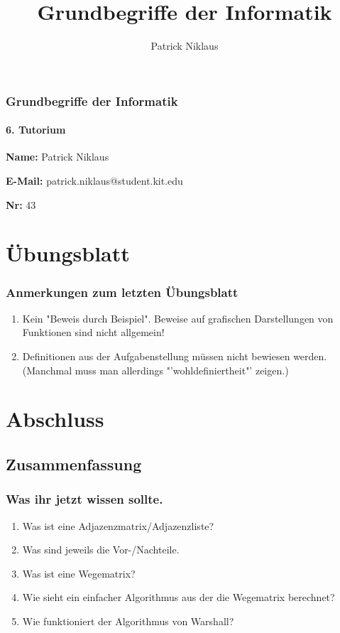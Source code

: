 \documentclass{beamer}
\title{Grundbegriffe der Informatik}
\author{Patrick Niklaus}
\begin{document}
\begin{frame}
  \frametitle{Grundbegriffe der Informatik}
  \framesubtitle{6. Tutorium}
  \begin{description}
    \item \textbf{Name:} Patrick Niklaus
    \item \textbf{E-Mail:} patrick.niklaus@student.kit.edu
    \item \textbf{Nr:} 43
  \end{description}
\end{frame}

\section{Übungsblatt}
\begin{frame}
  \frametitle{Anmerkungen zum letzten Übungsblatt}
  \begin{enumerate}
    \item Kein "Beweis durch Beispiel". Beweise auf grafischen Darstellungen von Funktionen sind nicht allgemein!
    \item Definitionen aus der Aufgabenstellung müssen nicht bewiesen werden.\\
          (Manchmal muss man allerdings "'wohldefiniertheit"' zeigen.)
  \end{enumerate}
\end{frame}




\section{Abschluss}
\subsection{Zusammenfassung}
\begin{frame}
  \frametitle{Was ihr jetzt wissen sollte.}
  \begin{enumerate}
    \item Was ist eine Adjazenzmatrix/Adjazenzliste?
    \item Was sind jeweils die Vor-/Nachteile.
    \item Was ist eine Wegematrix?
    \item Wie sieht ein einfacher Algorithmus aus der die Wegematrix berechnet?
    \item Wie funktioniert der Algorithmus von Warshall?
  \end{enumerate}
\end{frame}
\end{document}
